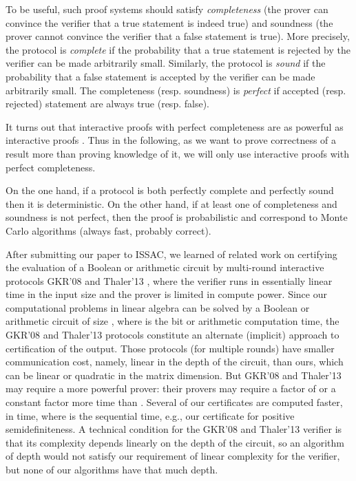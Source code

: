\documentclass{article}
\newcommand{\psdness}{positive semidefiniteness\xspace}
\begin{document}
To be useful, such proof systems should satisfy {\em completeness} (the prover
can convince the verifier that a true statement is indeed true) and soundness
(the prover cannot convince the verifier that a false statement is true). 
More precisely, the protocol is {\em complete} if the probability that a true
statement is rejected by the verifier can be made arbitrarily small.
Similarly, the protocol is {\em sound} if the probability that a false statement
is accepted by the verifier can be made arbitrarily small.
The completeness (resp. soundness) is {\em perfect} if accepted (resp. rejected)
statement are always true (resp. false). 

It turns out that interactive proofs with perfect completeness are as powerful
as interactive proofs \cite{Furer:1989:perfectcomp}.
Thus in the following, as we want to prove correctness of a result more than
proving knowledge of it, we will only use interactive proofs with perfect
completeness. 

On the one hand, if a protocol is both perfectly complete and perfectly sound
then it is deterministic. On the other hand, if at least one of completeness
and soundness is not perfect, then the proof is probabilistic and correspond to
Monte Carlo algorithms (always fast, probably correct).

 
 
 
 
 
 
After submitting our paper to ISSAC, we learned of related work on
certifying the evaluation of a Boolean or arithmetic circuit 
by multi-round interactive protocols
GKR'08 \cite{Goldwasser:2008:delegating} and Thaler'13
\cite{Thaler:2013:crypto}, 
where the verifier runs in  
essentially linear time in the input size
and the prover is limited in compute power.
Since our computational problems in linear algebra
can be solved by a Boolean or arithmetic circuit of size ,
where  is the bit or arithmetic computation time, 
the GKR'08 and Thaler'13 protocols constitute an alternate (implicit) approach
to certification of the output.  Those protocols (for multiple rounds) have
smaller communication cost, namely, linear in the depth of the circuit, 
than ours, which can be linear or quadratic in the matrix dimension.
But GKR'08 and Thaler'13 may require a more powerful prover:
their provers may require
a factor of  or a constant factor more time than .
Several of our certificates
are computed faster, in  time, where  is the sequential time,
e.g., our certificate for \psdness.
A technical condition for the GKR'08 and Thaler'13 verifier
is that its complexity depends linearly on the depth of the circuit, 
so an algorithm of depth  would not satisfy our requirement
of linear complexity for the verifier,  
but none of our algorithms have that much depth. 
\end{document}
